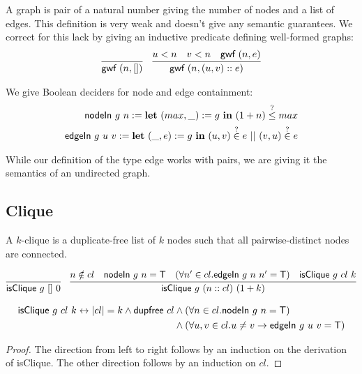 \documentclass[a4paper,UKenglish,cleveref, autoref]{lipics-v2019}
\newcommand{\TODO}[1]{}
\begin{document}
A graph is pair of a natural number giving the number of nodes and a list of edges. This definition is very weak and doesn't give any semantic guarantees. We correct for this lack by giving an inductive predicate defining well-formed graphs:
\begin{align*}
  \infer{\textsf{gwf}~(n,[])}{} && \infer{\textsf{gwf}~(n,(u, v) :: e)}{u < n \quad v < n \quad \textsf{gwf}~(n, e)}
\end{align*}

We give Boolean deciders for node and edge containment:
\begin{align*}
  \textsf{nodeIn}~g~n := \textbf{let}~ (max, \_) := g~\textbf{in}~ (1 + n) \overset{?}{\le} max\\
  \textsf{edgeIn}~g~u~v := \textbf{let}~ (\_, e) := g~\textbf{in}~ (u, v) \overset{?}{\in} e~||~(v, u) \overset{?}{\in} e
\end{align*}

While our definition of the type \textsf{edge} works with pairs, we are giving it the semantics of an undirected graph.

\subsection{Clique}
\TODO{add well-formedness as a requirement}
A $k$-clique is a duplicate-free list of $k$ nodes such that all pairwise-distinct nodes are connected.

\begin{align*}
  \infer{\textsf{isClique}~g~[]~0}{} && \infer{\textsf{isClique}~g~(n::cl)~(\natS k)}{n \notin cl \quad \textsf{nodeIn}~g~n = \btrue \quad (\forall n' \in cl. \textsf{edgeIn}~g~n~n' = \btrue) \quad \textsf{isClique}~g~cl~k}
\end{align*}

\begin{lemma}\label{prop:cliqueexpl}
  \begin{align*}
    \normalfont\textsf{isClique}~g~cl~k \leftrightarrow |cl| = k \land \normalfont\textsf{dupfree}~cl &\land (\forall n \in cl. \normalfont\textsf{nodeIn}~g~n = \mathsf{T}) \\
    &\land (\forall u,v \in cl. u \neq v \rightarrow \normalfont\textsf{edgeIn}~g~u~v = \mathsf{T})
  \end{align*}
\end{lemma}
\begin{proof}
  The direction from left to right follows by an induction on the derivation of \textsf{isClique}. The other direction follows by an induction on $cl$.
\end{proof}
\end{document}
